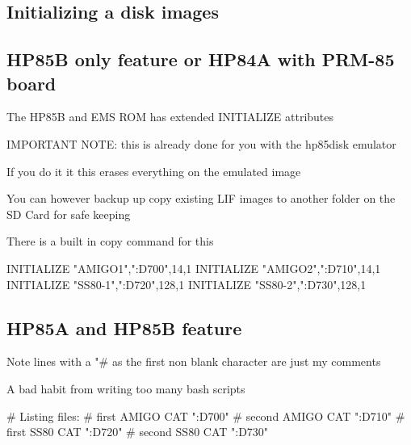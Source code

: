 \subsection*{Initializing a disk images}

\subsection*{H\+P85B only feature or H\+P84A with P\+R\+M-\/85 board}


\begin{DoxyItemize}
\item The H\+P85B and E\+MS R\+OM has extended I\+N\+I\+T\+I\+A\+L\+I\+ZE attributes
\item I\+M\+P\+O\+R\+T\+A\+NT N\+O\+TE\+: this is already done for you with the hp85disk emulator
\begin{DoxyItemize}
\item If you do it it this erases everything on the emulated image
\item You can however backup up copy existing L\+IF images to another folder on the SD Card for safe keeping
\begin{DoxyItemize}
\item There is a built in copy command for this 
\begin{DoxyPre}
  INITIALIZE "AMIGO1",":D700",14,1
  INITIALIZE "AMIGO2",":D710",14,1
  INITIALIZE "SS80-1",":D720",128,1
  INITIALIZE "SS80-2",":D730",128,1
\end{DoxyPre}

\end{DoxyItemize}
\end{DoxyItemize}
\end{DoxyItemize}

\subsection*{H\+P85A and H\+P85B feature}


\begin{DoxyItemize}
\item Note lines with a "\#\textquotesingle{} as the first non blank character are just my comments
\begin{DoxyItemize}
\item A bad habit from writing too many bash scripts
\end{DoxyItemize}
\end{DoxyItemize}


\begin{DoxyPre}
  \# Listing files:
  \# first AMIGO
  CAT ":D700"
  \# second AMIGO
  CAT ":D710"
  \# first SS80
  CAT ":D720"
  \# second SS80
  CAT ":D730"\end{DoxyPre}



